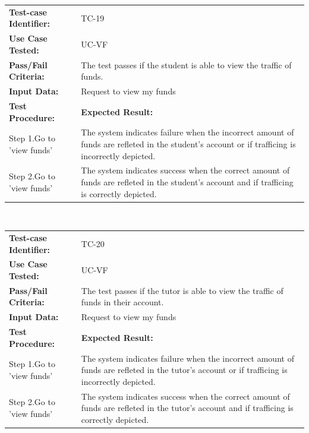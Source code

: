 \documentclass[12pt]{article}
\begin{document}
\begin{tabular}{| p{8cm} | p{8cm} |} \hline
	\textbf{Test-case Identifier:}& TC-19\\
	\textbf{Use Case Tested:}& UC-VF\\
	\textbf{Pass/Fail Criteria:}& The test passes if the student is able to view the traffic of funds.\\
	\textbf{Input Data:}& Request to view my funds\\\hline
	\textbf{Test Procedure:}& \textbf{Expected Result:} \\\hline
	Step 1.Go to 'view funds' & The system indicates failure when the incorrect  amount of funds are refleted in the student's account or if trafficing is incorrectly depicted. \\
	Step 2.Go to 'view funds' & The system indicates success when the correct  amount of funds are refleted in the student's account and if trafficing is correctly depicted.\\
		\hline
\end{tabular}
\\

\begin{tabular}{| p{8cm} | p{8cm} |} \hline
	\textbf{Test-case Identifier:}& TC-20\\
	\textbf{Use Case Tested:}& UC-VF\\
	\textbf{Pass/Fail Criteria:}& The test passes if the tutor is able to view the traffic of funds in their account.\\
	\textbf{Input Data:}& Request to view my funds\\\hline
	\textbf{Test Procedure:}& \textbf{Expected Result:} \\\hline
	Step 1.Go to 'view funds' & The system indicates failure when the incorrect  amount of funds are refleted in the tutor's account or if trafficing is incorrectly depicted. \\
	Step 2.Go to 'view funds' & The system indicates success when the correct  amount of funds are refleted in the tutor's account and if trafficing is correctly depicted.\\
		\hline
\end{tabular}
\\
\end{document}

